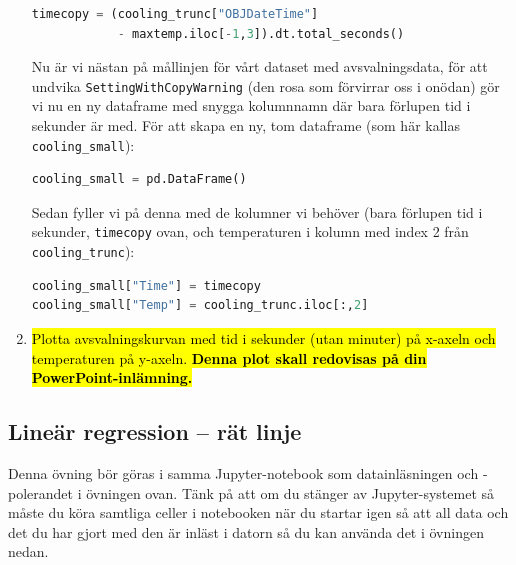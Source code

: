 \documentclass{article}
\begin{document}
\begin{enumerate}
    \begin{lstlisting}[language=Python]
timecopy = (cooling_trunc["OBJDateTime"]
            - maxtemp.iloc[-1,3]).dt.total_seconds()
\end{lstlisting}
    Nu är vi nästan på mållinjen för vårt dataset med avsvalningsdata, för att undvika \texttt{SettingWithCopyWarning} (den rosa som förvirrar oss i onödan) gör vi nu en ny dataframe med snygga kolumnnamn där bara förlupen tid i sekunder är med. För att skapa en ny, tom dataframe (som här kallas \texttt{cooling\_small}):
    \begin{lstlisting}[language=Python]
cooling_small = pd.DataFrame()
\end{lstlisting}
    Sedan fyller vi på denna med de kolumner vi behöver (bara förlupen tid i sekunder, \texttt{timecopy} ovan, och temperaturen i kolumn med index 2 från \texttt{cooling\_trunc}):
    \begin{lstlisting}[language=Python]
cooling_small["Time"] = timecopy
cooling_small["Temp"] = cooling_trunc.iloc[:,2]
\end{lstlisting}
    \item \hl{Plotta avsvalningskurvan med tid i sekunder (utan minuter) på x-axeln och temperaturen på y-axeln. \textbf{Denna plot skall redovisas på din PowerPoint-inlämning.}}
\end{enumerate}

\subsection{Lineär regression -- rät linje}
Denna övning bör göras i samma Jupyter-notebook som datainläsningen och -polerandet i övningen ovan. Tänk på att om du stänger av Jupyter-systemet så måste du köra samtliga celler i notebooken när du startar igen så att all data och det du har gjort med den är inläst i datorn så du kan använda det i övningen nedan.
\end{document}
